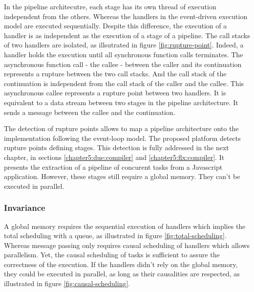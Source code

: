 In the pipeline architecutre, each stage has its own thread of execution independent from the others.
Whereas the handlers in the event-driven execution model are executed sequentially.
Despite this difference, the execution of a handler is as independent as the execution of a stage of a pipeline.
The call stacks of two handlers are isolated, as illsutrated in figure \ref{fig:rupture-point}.
Indeed, a handler holds the execution until all synchronous function calls terminates.
The asynchronous function call - the callee - between the caller and its continuation represents a rupture between the two call stacks.
And the call stack of the continuation is independent from the call stack of the caller and the callee.
This asynchronous callee represents a rupture point between two handlers.
It is equivalent to a data stream between two stages in the pipeline architecture.
It sends a message between the callee and the continuation.


The detection of rupture points allows to map a pipeline architecture onto the implementation following the event-loop model.
The proposed platform detects rupture points defining stages. %
This detection is fully addressed in the next chapter, in sections \ref{chapter5:due:compiler} and \ref{chapter5:flx:compiler}.
It presents the extraction of a pipeline of concurent tasks from a Javascript application.
However, these stages still require a global memory.
They can't be executed in parallel.

\subsubsection{Invariance}


A global memory requires the sequential execution of handlers which implies the total scheduling with a queue, as illustrated in figure \ref{fig:total-scheduling}.
Whereas message passing only requires causal scheduling of handlers which allows parallelism.
Yet, the causal scheduling of tasks is sufficient to assure the correctness of the execution.
If the handlers didn't rely on the global memory, they could be executed in parallel, as long as their causalities are respected, as illustrated in figure \ref{fig:causal-scheduling}.

